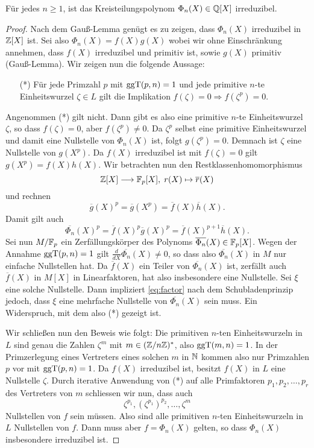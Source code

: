 \documentclass{book}
\begin{document}
\begin{thm} Für jedes $n \ge 1$, ist das Kreisteilungspolynom $\Phi_n(X) \in \mathbb{Q}[X]$ irreduzibel. 
\end{thm}
\begin{proof}
	Nach dem Gauß-Lemma genügt es zu zeigen, dass $\Phi_n(X)$ irreduzibel in $\mathbb{Z}[X]$ ist. Sei
	also $\Phi_n(X) = f(X) g(X)$ wobei wir ohne Einschränkung annehmen, dass $f(X)$ irreduzibel
	und primitiv ist, sowie $g(X)$ primitiv (Gauß-Lemma). Wir zeigen nun die folgende Aussage:
	\begin{itemize}
		\item[(*)] Für jede Primzahl $p$ mit $\operatorname{ggT}(p,n) =1$ und jede primitive $n$-te
			Einheitswurzel $\zeta \in L$ gilt die Implikation $f(\zeta) = 0 \Rightarrow
			f(\zeta^p) = 0$. 
	\end{itemize}
	Angenommen (*) gilt nicht. Dann gibt es also eine primitive $n$-te Einheitswurzel $\zeta$,
	so dass $f(\zeta) = 0$, aber $f(\zeta^p) \ne 0$. Da $\zeta^p$ selbst eine primitive
	Einheitswurzel und damit eine Nullstelle von $\Phi_n(X)$ ist, folgt $g(\zeta^p) = 0$.
	Demnach ist $\zeta$ eine Nullstelle von $g(X^p)$. Da $f(X)$ irreduzibel ist mit $f(\zeta) =
	0$ gilt $g(X^p) = f(X)h(X)$. Wir betrachten nun den Restklassenhomomorphismus
	\[
		\mathbb{Z}[X] \longrightarrow \mathbb{F}_p[X],\; r(X) \mapsto \overline{r}(X)
	\]
	und rechnen
	\[
		\overline{g}(X)^p = \overline{g}(X^p) = \overline{f}(X)\overline{h}(X).
	\]
	Damit gilt auch 
	\begin{equation}\label{eq:factor}
			\overline{\Phi_n}(X)^p = \overline{f}(X)^p\overline{g}(X)^p =
			\overline{f}(X)^{p+1}\overline{h}(X).
	\end{equation}
	Sei nun $M/\mathbb{F}_p$ ein Zerfällungskörper des Polynoms $\overline{\Phi_n}(X) \in \mathbb{F}_p[X]$.
	Wegen der Annahme $\operatorname{ggT}(p,n) = 1$ gilt $\frac{d}{dX}\overline{\Phi_n}(X) \ne 0$, so dass also
	$\overline{\Phi_n}(X)$ in $M$ nur einfache Nullstellen hat. Da $\overline{f}(X)$ ein Teiler
	von $\overline{\Phi_n}(X)$ ist, zerfällt auch $\overline{f}(X)$ in $M[X]$ in Linearfaktoren,
	hat also insbesondere eine Nullstelle. Sei $\xi$ eine solche Nullstelle. Dann impliziert
	\eqref{eq:factor} nach dem Schubladenprinzip jedoch, dass $\xi$ eine mehrfache Nullstelle von
	$\overline{\Phi_n}(X)$ sein muss. Ein Widerspruch, mit dem also (*) gezeigt ist. 

	Wir schließen nun den Beweis wie folgt: Die primitiven $n$-ten Einheitswurzeln in $L$ sind
	genau die Zahlen $\zeta^m$ mit $m \in (\mathbb{Z}/n\mathbb{Z} )^*$, also $\operatorname{ggT}(m,n) = 1$. In der
	Primzerlegung eines Vertreters eines solchen $m$ in $\mathbb{N}$ kommen also nur Primzahlen $p$ vor
	mit $\operatorname{ggT}(p,n) = 1$. Da $f(X)$ irreduzibel ist, besitzt $f(X)$ in $L$ eine Nullstelle
	$\zeta$. Durch iterative Anwendung von (*) auf alle Primfaktoren $p_1, p_2, \dots, p_r$ des Vertreters von $m$
	schliessen wir nun, dass auch 
	\[
		\zeta^{p_1}, (\zeta^{p_1})^{p_2}, \dots ,\zeta^m 
	\]
	Nullstellen von $f$ sein müssen. Also sind alle primitiven $n$-ten Einheitswurzeln in $L$
	Null\-stellen von
	$f$. Dann muss aber $f = \Phi_n(X)$ gelten, so dass $\Phi_n(X)$ insbesondere irreduzibel
	ist.  
\end{proof}
\end{document}
